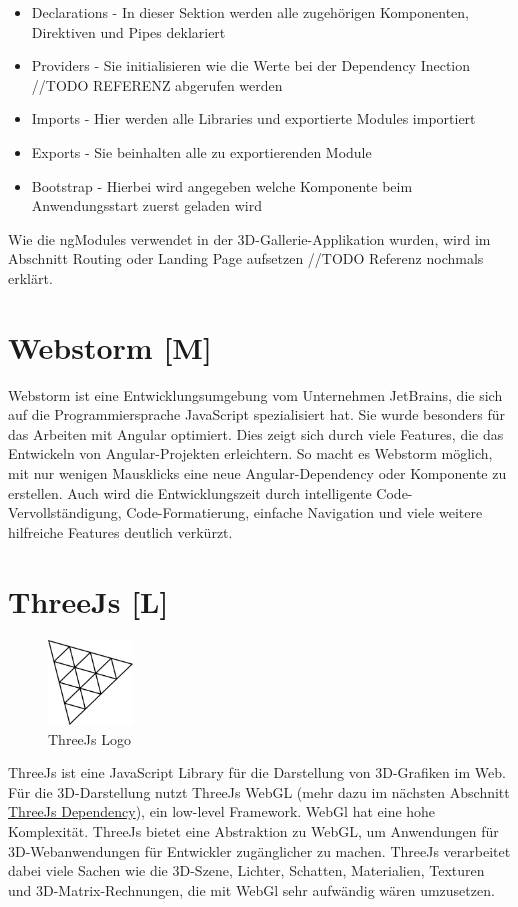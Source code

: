 \begin{itemize}
  \item Declarations - In dieser Sektion werden alle zugehörigen Komponenten, Direktiven und Pipes deklariert 
  \item Providers - Sie initialisieren wie die Werte bei der Dependency Inection //TODO REFERENZ abgerufen werden \cite{AngularProviders}
  \item Imports - Hier werden alle Libraries und exportierte Modules importiert
  \item Exports - Sie beinhalten alle zu exportierenden Module
  \item Bootstrap - Hierbei wird angegeben welche Komponente beim Anwendungsstart zuerst geladen wird
\end{itemize}

Wie die ngModules verwendet in der 3D-Gallerie-Applikation wurden, wird im Abschnitt Routing oder Landing Page aufsetzen //TODO Referenz nochmals erklärt.
\cite{AngularNgModules}
\cite{AngularNgModulesAPI}
\cite{AngularBuch}


\section{Webstorm [M]}
Webstorm ist eine Entwicklungsumgebung vom Unternehmen JetBrains, die sich auf die Programmiersprache JavaScript spezialisiert hat. Sie wurde besonders für das Arbeiten mit Angular optimiert. Dies zeigt sich durch viele Features, die das Entwickeln von Angular-Projekten erleichtern. So macht es Webstorm möglich, mit nur wenigen Mausklicks eine neue Angular-Dependency oder Komponente zu erstellen. Auch wird die Entwicklungszeit durch intelligente Code-Vervollständigung, Code-Formatierung, einfache Navigation und viele weitere hilfreiche Features deutlich verkürzt.


\section{ThreeJs [L]}
\begin{figure}
    \begin{center}
      \includegraphics[width=0.2\textwidth]{pics/threeJS.png}
     \caption{ThreeJs Logo}
    \end{center}
\end{figure}
ThreeJs ist eine JavaScript Library für die Darstellung von 3D-Grafiken im Web. Für die 3D-Darstellung nutzt ThreeJs WebGL (mehr dazu im nächsten Abschnitt \hyperref[ch::ThreeJsDependency]{ThreeJs Dependency}), ein low-level Framework. WebGl hat eine hohe Komplexität. ThreeJs bietet eine Abstraktion zu WebGL, um Anwendungen für 3D-Webanwendungen für Entwickler zugänglicher zu machen. ThreeJs verarbeitet dabei viele Sachen wie die 3D-Szene, Lichter, Schatten, Materialien, Texturen und 3D-Matrix-Rechnungen, die mit WebGl sehr aufwändig wären umzusetzen.

